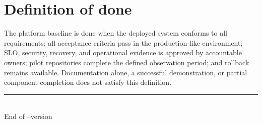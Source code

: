 \section{Definition of done}

The platform baseline is done when the deployed system conforms to all \must
requirements; all acceptance criteria pass in the production-like environment; SLO,
security, recovery, and operational evidence is approved by accountable owners; pilot
repositories complete the defined observation period; and rollback remains available.
Documentation alone, a successful demonstration, or partial component completion does
not satisfy this definition.

\vfill
\begin{center}
  \color{MidGray}\rule{0.6\textwidth}{0.5pt}\\[0.7em]
  \small\color{DarkGray}End of \DocumentID\enspace--\enspace version \DocumentVersion
\end{center}
